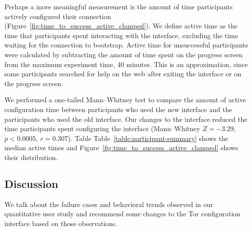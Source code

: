 \documentclass[USenglish,oneside,twocolumn]{article}
\begin{document}

Perhaps a more meaningful measurement is the amount of time participants actively configured their connection (Figure~\ref{fig:time_to_success_active_clamped}). We define active time as the time that participants spent interacting with the interface, excluding the time waiting for the connection to bootstrap. Active time for unsuccessful participants were calculated by subtracting the amount of time spent on the progress screen from the maximum experiment time, 40 minutes. This is an approximation, since some participants searched for help on the web after exiting the interface or on the progress screen. 

We performed a one-tailed Mann--Whitney test to compare the amount of active configuration time between participants who used the new interface and the participants who used the old interface. Our changes to the interface reduced the time participants spent configuring the interface (Mann--Whitney $Z = -3.29$, $p < 0.0005$, $r = 0.307$). Table Table~\ref{table:participant-summary} shows the median active times and Figure~\ref{fig:time_to_success_active_clamped} shows their distribution.


\subsection{Discussion} 
We talk about the failure cases and behavioral trends observed in our quantitative user study and recommend some changes to the Tor configuration interface based on those observations. 
\end{document}
